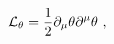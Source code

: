 \begin{equation}\label{2.9}
{\cal L}_\theta = \frac{1}{2} \partial_\mu \theta
\partial^\mu \theta  ~,
\end{equation}

